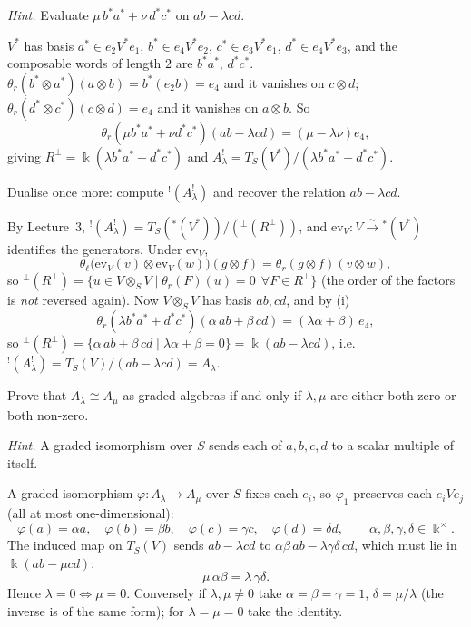 \documentclass[11pt,a4paper]{exam}
\newcommand{\kk}{\Bbbk}
\begin{document}
\begin{questions}
\begin{parts}
\begin{subparts}
\emph{Hint.} Evaluate $\mu\,b^*a^*+\nu\,d^*c^*$ on $ab-\lambda cd$.
\begin{solution}
$V^*$ has basis $a^*\in e_2V^*e_1$, $b^*\in e_4V^*e_2$, $c^*\in e_3V^*e_1$, $d^*\in e_4V^*e_3$, and the composable words of length $2$ are $b^*a^*$, $d^*c^*$.
$\theta_r(b^*\otimes a^*)(a\otimes b)=b^*(e_2b)=e_4$ and it vanishes on $c\otimes d$; $\theta_r(d^*\otimes c^*)(c\otimes d)=e_4$ and it vanishes on $a\otimes b$.
So
\[
  \theta_r(\mu b^*a^*+\nu d^*c^*)(ab-\lambda cd)=(\mu-\lambda\nu)e_4,
\]
giving $R^\perp=\kk(\lambda b^*a^*+d^*c^*)$ and $A_\lambda^!=T_S(V^*)/(\lambda b^*a^*+d^*c^*)$.
\end{solution}
\subpart Dualise once more: compute ${}^!(A_\lambda^!)$ and recover the relation $ab-\lambda cd$.
\begin{solution}
By Lecture~3, ${}^!(A_\lambda^!)=T_S({}^*(V^*))/({}^\perp(R^\perp))$, and $\mathrm{ev}_V:V\xrightarrow{\sim}{}^*(V^*)$ identifies the generators.
Under $\mathrm{ev}_V$,
\[
  \theta_\ell\bigl(\mathrm{ev}_V(v)\otimes\mathrm{ev}_V(w)\bigr)(g\otimes f)=\theta_r(g\otimes f)(v\otimes w),
\]
so ${}^\perp(R^\perp)=\{u\in V\otimes_SV\mid\theta_r(F)(u)=0\ \ \forall F\in R^\perp\}$ (the order of the factors is \emph{not} reversed again).
Now $V\otimes_SV$ has basis $ab,cd$, and by (i)
\[
  \theta_r(\lambda b^*a^*+d^*c^*)(\alpha\,ab+\beta\,cd)=(\lambda\alpha+\beta)\,e_4,
\]
so ${}^\perp(R^\perp)=\{\alpha\,ab+\beta\,cd\mid\lambda\alpha+\beta=0\}=\kk(ab-\lambda cd)$, i.e.\ ${}^!(A_\lambda^!)=T_S(V)/(ab-\lambda cd)=A_\lambda$.
\end{solution}
\subpart Prove that $A_\lambda\cong A_\mu$ as graded algebras if and only if $\lambda,\mu$ are either both zero or both non-zero.

\emph{Hint.} A graded isomorphism over $S$ sends each of $a,b,c,d$ to a scalar multiple of itself.
\begin{solution}
A graded isomorphism $\varphi:A_\lambda\to A_\mu$ over $S$ fixes each $e_i$, so $\varphi_1$ preserves each $e_iVe_j$ (all at most one-dimensional):
\[
  \varphi(a)=\alpha a,\quad\varphi(b)=\beta b,\quad\varphi(c)=\gamma c,\quad\varphi(d)=\delta d,\qquad\alpha,\beta,\gamma,\delta\in\kk^\times.
\]
The induced map on $T_S(V)$ sends $ab-\lambda cd$ to $\alpha\beta\,ab-\lambda\gamma\delta\,cd$, which must lie in $\kk(ab-\mu cd)$:
\[
  \mu\,\alpha\beta=\lambda\,\gamma\delta.
\]
Hence $\lambda=0\Leftrightarrow\mu=0$. Conversely if $\lambda,\mu\neq0$ take $\alpha=\beta=\gamma=1$, $\delta=\mu/\lambda$ (the inverse is of the same form); for $\lambda=\mu=0$ take the identity.
\end{solution}
\end{subparts}

\end{parts}
\end{questions}
\end{document}
